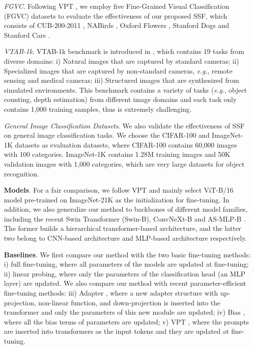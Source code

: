 \textit{FGVC}. Following VPT \cite{jia2022visual}, we employ five Fine-Grained Visual Classification (FGVC) datasets to evaluate the effectiveness of our proposed SSF, which consists of CUB-200-2011 \cite{wah2011caltech}, NABirds \cite{van2015building}, Oxford Flowers \cite{nilsback2008automated}, Stanford Dogs \cite{khosla2011novel} and Stanford Cars \cite{gebru2017fine}. 

\textit{VTAB-1k}. VTAB-1k benchmark is introduced in \cite{zhai2019large}, which contains 19 tasks from diverse domains: i) Natural images that are captured by standard cameras; ii) Specialized images that are captured by non-standard cameras, \emph{e.g.}, remote sensing and medical cameras; iii) Structured images that are synthesized from simulated environments. This benchmark contains a variety of tasks (\emph{e.g.}, object counting, depth estimation) from different image domains and each task only contains 1,000 training samples, thus is extremely challenging. 

\textit{General Image Classification Datasets}. We also validate the effectiveness of SSF on general image classification tasks. We choose the CIFAR-100 \cite{krizhevsky2009learning} and ImageNet-1K \cite{deng2009imagenet} datasets as evaluation datasets, where CIFAR-100 contains 60,000 images with 100 categories. ImageNet-1K contains 1.28M training images and 50K validation images with 1,000 categories, which are very large datasets for object recognition.

\textbf{Models}. For a fair comparison, we follow VPT \cite{jia2022visual} and mainly select ViT-B/16 \cite{dosovitskiy2020image} model pre-trained on ImageNet-21K as the initialization for fine-tuning. In addition, we also generalize our method to backbones of different model families, including the recent Swin Transformer \cite{liu2021swin} (Swin-B), ConvNeXt-B \cite{liu2022convnet} and AS-MLP-B \cite{Lian_2021_ASMLP}. The former builds a hierarchical transformer-based architecture, and the latter two belong to CNN-based architecture and MLP-based architecture respectively.

\textbf{Baselines}. We first compare our method with the two basic fine-tuning methods: i) full fine-tuning, where all parameters of the models are updated at fine-tuning; ii) linear probing, where only the parameters of the classification head (an MLP layer) are updated.  We also compare our method with recent parameter-efficient fine-tuning methods: iii) Adapter \cite{houlsby2019parameter}, where a new adapter structure with up-projection, non-linear function, and down-projection is inserted into the transformer and only the parameters of this new module are updated; iv) Bias \cite{zaken2021bitfit}, where all the bias terms of parameters are updated; v) VPT \cite{jia2022visual}, where the prompts are inserted into transformers as the input tokens and they are updated at fine-tuning.  

